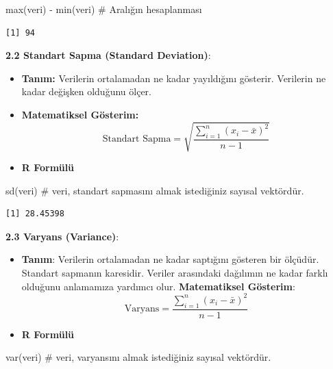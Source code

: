 \documentclass[
  letterpaper,
  DIV=11,
  numbers=noendperiod]{scrartcl}
\newenvironment{Shaded}{\begin{snugshade}}{\end{snugshade}}
\newcommand{\CommentTok}[1]{\textcolor[rgb]{0.37,0.37,0.37}{#1}}
\newcommand{\FunctionTok}[1]{\textcolor[rgb]{0.28,0.35,0.67}{#1}}
\newcommand{\NormalTok}[1]{\textcolor[rgb]{0.00,0.23,0.31}{#1}}
\newcommand{\SpecialCharTok}[1]{\textcolor[rgb]{0.37,0.37,0.37}{#1}}
\begin{document}
\begin{Shaded}
\begin{Highlighting}[]
\FunctionTok{max}\NormalTok{(veri) }\SpecialCharTok{{-}} \FunctionTok{min}\NormalTok{(veri)  }\CommentTok{\# Aralığın hesaplanması}
\end{Highlighting}
\end{Shaded}

\begin{verbatim}
[1] 94
\end{verbatim}

\textbf{2.2 Standart Sapma (Standard Deviation)}:

\begin{itemize}
\item
  \textbf{Tanım:} Verilerin ortalamadan ne kadar yayıldığını gösterir.
  Verilerin ne kadar değişken olduğunu ölçer.
\item
  \textbf{Matematiksel Gösterim:}
  \[\text{Standart Sapma} = \sqrt{\frac{\sum_{i=1}^{n} (x_i - \bar{x})^2}{n-1}} \]
\item
  \textbf{R Formülü}
\end{itemize}

\begin{Shaded}
\begin{Highlighting}[]
\FunctionTok{sd}\NormalTok{(veri)  }\CommentTok{\# veri, standart sapmasını almak istediğiniz sayısal vektördür.}
\end{Highlighting}
\end{Shaded}

\begin{verbatim}
[1] 28.45398
\end{verbatim}

\textbf{2.3 Varyans (Variance)}:

\begin{itemize}
\item
  \textbf{Tanım}: Verilerin ortalamadan ne kadar saptığını gösteren bir
  ölçüdür. Standart sapmanın karesidir. Veriler arasındaki dağılımın ne
  kadar farklı olduğunu anlamamıza yardımcı olur. \textbf{Matematiksel
  Gösterim}:
  \[ \text{Varyans} = \frac{\sum_{i=1}^{n} (x_i - \bar{x})^2}{n-1}​\]
\item
  \textbf{R Formülü}
\end{itemize}

\begin{Shaded}
\begin{Highlighting}[]
\FunctionTok{var}\NormalTok{(veri)  }\CommentTok{\# veri, varyansını almak istediğiniz sayısal vektördür.}
\end{Highlighting}
\end{Shaded}
\end{document}
